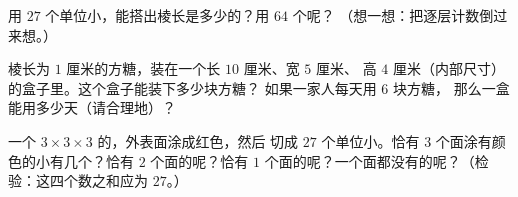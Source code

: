 \begin{exercise}[$\star$]\label{exo:g5:solids:8}
用 $27$ 个单位小，能搭出棱长是多少的？用 $64$ 个呢？
（想一想：把逐层计数倒过来想。）
\end{exercise}

\begin{exercise}[$\star\star$]\label{exo:g5:solids:9}
棱长为 $1$ 厘米的方糖，装在一个长 $10$ 厘米、宽 $5$ 厘米、
高 $4$ 厘米（内部尺寸）的盒子里。这个盒子能装下多少块方糖？
如果一家人每天用 $6$ 块方糖，
那么一盒能用多少天（请合理地）？
\end{exercise}

\begin{exercise}[$\star\star$]\label{exo:g5:solids:10}
一个 $3 \times 3 \times 3$ 的，外表面涂成红色，然后
切成 $27$ 个单位小。恰有
$3$ 个面涂有颜色的小有几个？恰有 $2$ 个面的呢？恰有 $1$ 个面的呢？一个面都没有的呢？（检验：这四个数之和应为
$27$。）
\end{exercise}
